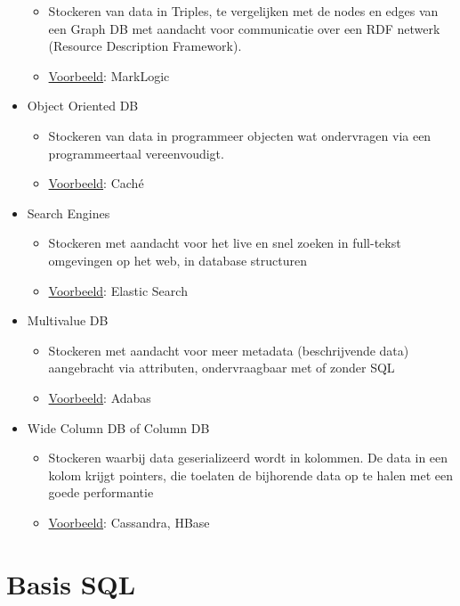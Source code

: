 \documentclass{article}
\begin{document}
\begin{itemize}
    \begin{itemize}
        \item Stockeren van data in Triples, te vergelijken met de nodes en edges van een Graph DB met aandacht voor communicatie over een RDF netwerk (Resource Description Framework).
        \item \underline{Voorbeeld}: MarkLogic
    \end{itemize}
    \item Object Oriented DB
    \begin{itemize}
        \item Stockeren van data in programmeer objecten wat ondervragen via een programmeertaal vereenvoudigt.
        \item \underline{Voorbeeld}: Caché
    \end{itemize}
    \item Search Engines
    \begin{itemize}
        \item Stockeren met aandacht voor het live en snel zoeken in full-tekst omgevingen op het web, in database structuren
        \item \underline{Voorbeeld}: Elastic Search
    \end{itemize}
    \item Multivalue DB
    \begin{itemize}
        \item Stockeren met aandacht voor meer metadata (beschrijvende data) aangebracht via attributen, ondervraagbaar met of zonder SQL
        \item \underline{Voorbeeld}: Adabas
    \end{itemize}
    \item Wide Column DB of Column DB
    \begin{itemize}
        \item Stockeren waarbij data geserializeerd wordt in kolommen. De data in een kolom krijgt pointers, die toelaten de bijhorende data op te halen met een goede performantie
        \item \underline{Voorbeeld}: Cassandra, HBase
    \end{itemize}
\end{itemize}

\section{Basis SQL}
\end{document}
